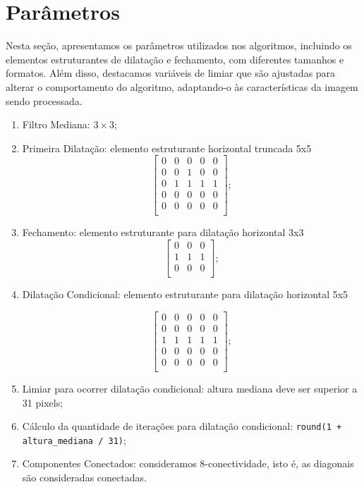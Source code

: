 \documentclass[english, 
               brazil, 
               bsc] %
               {dcomp-abntex2}
\begin{document}
\section{Parâmetros} \label{sec-parametros}
Nesta seção, apresentamos os parâmetros utilizados nos algoritmos, incluindo os elementos estruturantes de dilatação e fechamento, com diferentes tamanhos e formatos. Além disso, destacamos variáveis de limiar que são ajustadas para alterar o comportamento do algoritmo, adaptando-o às características da imagem sendo processada.


\begin{enumerate}
  \item Filtro Mediana: $3 \times 3$;
  \item Primeira Dilatação: elemento estruturante horizontal truncada 5x5
\[
\begin{bmatrix}
0 & 0 & 0 & 0 & 0 \\
0 & 0 & 1 & 0 & 0 \\
0 & 1 & 1 & 1 & 1 \\
0 & 0 & 0 & 0 & 0 \\
0 & 0 & 0 & 0 & 0 \\
\end{bmatrix};
\]
  \item Fechamento: elemento estruturante para dilatação horizontal 3x3
\[
\begin{bmatrix}
0 & 0 & 0 \\
1 & 1 & 1 \\
0 & 0 & 0 \\
\end{bmatrix};
\]


  \item Dilatação Condicional: elemento estruturante para dilatação horizontal 5x5


\[
\begin{bmatrix}
0 & 0 & 0 & 0 & 0 \\
0 & 0 & 0 & 0 & 0 \\
1 & 1 & 1 & 1 & 1 \\
0 & 0 & 0 & 0 & 0 \\
0 & 0 & 0 & 0 & 0 \\
\end{bmatrix};
\]
       
\item Limiar para ocorrer dilatação condicional: altura mediana deve ser superior a 31 pixels;


\item Cálculo da quantidade de iterações para dilatação condicional: \texttt{round(1 + altura\_mediana / 31)};


\item Componentes Conectados: consideramos 8-conectividade, isto é, as diagonais são consideradas conectadas.


\end{enumerate}
\end{document}
